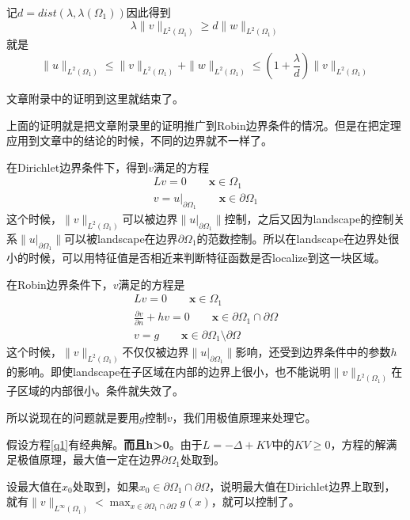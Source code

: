 \documentclass[UTF8,12pt]{article}
\begin{document}
记$d = dist(\lambda, \lambda(\Omega_1))$因此得到
\begin{equation}
\lambda \| v \|_{L^2(\Omega_1)} \geq d \|w\|_{L^2(\Omega_1)}
\end{equation}
就是
\begin{equation}
\|u\|_{L^2(\Omega_1)} \leq \|v\|_{L^2(\Omega_1)} + \|w\|_{L^2(\Omega_1)} \leq (1 + \frac{\lambda}{d}) \|v\|_{L^2(\Omega_1)}
\end{equation}

文章附录中的证明到这里就结束了。

\vline

上面的证明就是把文章附录里的证明推广到Robin边界条件的情况。但是在把定理应用到文章中的结论的时候，不同的边界就不一样了。

在Dirichlet边界条件下，得到$v$满足的方程
\begin{eqnarray}
L v = 0 \qquad \mathbf{x} \in \Omega_1 \\
v = u|_{\partial \Omega_1} \qquad \mathbf{x} \in \partial \Omega_1
\end{eqnarray}
这个时候，$\|v\|_{L^2(\Omega_1)}$可以被边界$\|u|_{\partial \Omega_1}\|$控制，之后又因为landscape的控制关系$\|u|_{\partial \Omega_1}\|$可以被landscape在边界$\partial \Omega_1$的范数控制。所以在landscape在边界处很小的时候，可以用特征值是否相近来判断特征函数是否localize到这一块区域。

在Robin边界条件下，$v$满足的方程是
\begin{eqnarray}\label{q1}
L v = 0 \qquad \mathbf{x} \in \Omega_1 \\
\frac{\partial v}{\partial n} + h v = 0 \qquad \mathbf{x} \in \partial \Omega_1 \cap \partial \Omega \\
v = g \qquad \mathbf{x} \in \partial \Omega_1 \setminus \partial \Omega
\end{eqnarray}
这个时候，$\|v\|_{L^2(\Omega_1)}$不仅仅被边界$\|u|_{\partial \Omega_1}\|$影响，还受到边界条件中的参数$h$的影响。即使landscape在子区域在内部的边界上很小，也不能说明$\|v\|_{L^2(\Omega_1)}$在子区域的内部很小。条件就失效了。

所以说现在的问题就是要用$g$控制$v$，我们用极值原理来处理它。

假设方程\ref{q1}有经典解。\textbf{而且h>0}。由于$L = -\Delta + KV$中的$KV \geq 0$，方程的解满足极值原理，最大值一定在边界$\partial \Omega_1$处取到。

设最大值在$x_0$处取到，如果$x_0 \in \partial \Omega_1 \cap \partial \Omega $，说明最大值在Dirichlet边界上取到，就有$\|v\|_{L^\infty(\Omega_1)} < \max_{x \in \partial \Omega_1 \cap \partial \Omega} g(x)$，就可以控制了。
\end{document}

